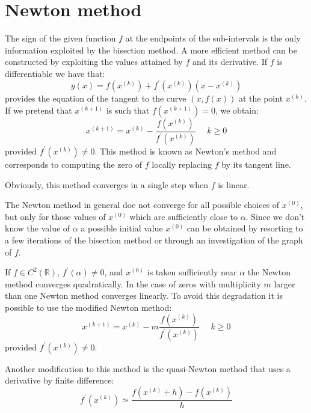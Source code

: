 \documentclass[12pt, a4paper]{report}
\begin{document}
    \section{Newton method}
    The sign of the given function $f$ at the endpoints of the sub-intervals is the only information exploited by the bisection method. A more efficient method can be constructed 
    by exploiting the values attained by $f$ and its derivative. If $f$ is differentiable we have that: 
    \[y(x)=f(x^{(k)})+f^{'}(x^{(k)})(x-x^{(k)})\]
    provides the equation of the tangent to the curve $(x,f(x))$ at the point $x^{(k)}$. If we pretend that $x^{(k+1)}$ is such that $f(x^{(k+1)})=0$, we obtain:
    \[x^{(k+1)}=x^{(k)}-\dfrac{f(x^{(k)})}{f^{'}(x^{(k)})} \:\:\:\:\:\: k \geq 0\]
    provided $f^{'}(x^{(k)}) \neq 0$. This method is known as Newton's method and corresponds to computing the zero of $f$ locally replacing $f$ by its tangent line. 

    Obviously, this method converges in a single step when $f$ is linear. 

    The Newton method in general doe not converge for all possible choices of $x^{(0)}$, but only for those values of $x^{(0)}$ which are sufficiently close to $\alpha$. Since we 
    don't know the value of $\alpha$ a possible initial value $x^{(0)}$ can be obtained by resorting to a few iterations of the bisection method or through an investigation of the 
    graph of $f$. 

    If $f \in C^2(\mathbb{R})$, $f^{'}(\alpha) \neq 0$, and $x^{(0)}$ is taken sufficiently near $\alpha$ the Newton method converges quadratically. In the case of zeros with 
    multiplicity $m$ larger than one Newton method converges linearly. To avoid this degradation it is possible to use the modified Newton method:
    \[x^{(k+1)}=x^{(k)}-m\dfrac{f(x^{(k)})}{f^{'}(x^{(k)})} \:\:\:\:\:\: k \geq 0\]
    provided $f^{'}(x^{(k)}) \neq 0$.

    Another modification to this method is the quasi-Newton method that uses a derivative by finite difference: 
    \[f^{'}(x^{(k)}) \simeq \dfrac{f(x^{(k)}+h)-f(x^{(k)})}{h}\]
\end{document}
